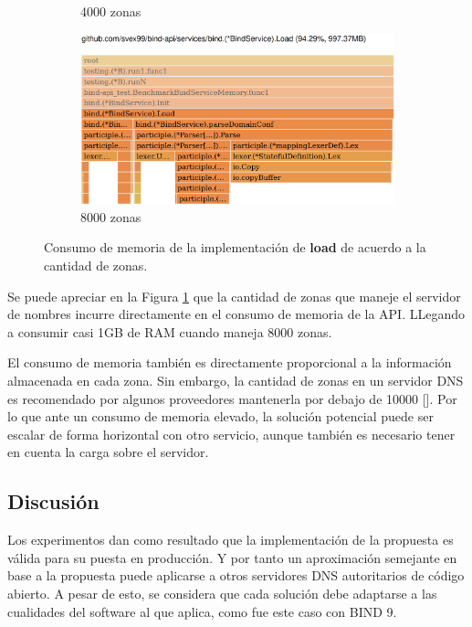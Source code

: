 \begin{figure}
\begin{subfigure}{0.49\textwidth}
        \caption{4000 zonas}
    \end{subfigure}
    \hfill
    \begin{subfigure}{0.49\textwidth}
        \includegraphics[width=\textwidth]{Graphics/mem8000z.png}
        \caption{8000 zonas}
    \end{subfigure}
            
    \caption{Consumo de memoria de la implementación de \textbf{load} de acuerdo a la cantidad de zonas.}
    \label{fig:bench-mem}
\end{figure}

Se puede apreciar en la Figura \ref{fig:bench-mem} que la cantidad de zonas que maneje el servidor de nombres incurre directamente en el consumo de memoria de la API. LLegando a consumir casi 1GB de RAM cuando maneja 8000 zonas.

El consumo de memoria también es directamente proporcional a la información almacenada en cada zona. Sin embargo, la cantidad de zonas en un servidor DNS es recomendado por algunos proveedores mantenerla por debajo de 10000 [\cite{dns-cap}]. Por lo que ante un consumo de memoria elevado, la solución potencial puede ser escalar de forma horizontal con otro servicio, aunque también es necesario tener en cuenta la carga sobre el servidor.

\subsection{Discusión}

Los experimentos dan como resultado que la implementación de la propuesta es válida para su puesta en producción. Y por tanto un aproximación semejante en base a la propuesta puede aplicarse a otros servidores DNS autoritarios de código abierto. A pesar de esto, se considera que cada solución debe adaptarse a las cualidades del software al que aplica, como fue este caso con BIND 9.


